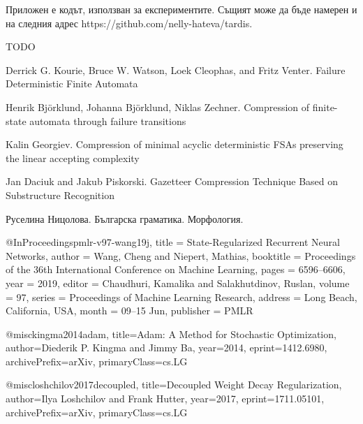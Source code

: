 \documentclass[a4paper,12pt]{article}
\begin{document}
Приложен е кодът, използван за експериментите. Същият може да бъде намерен и на следния адрес https://github.com/nelly-hateva/tardis.

TODO

\pagebreak

\begin{thebibliography}{}

\newblock Derrick G. Kourie, Bruce W. Watson, Loek Cleophas, and Fritz Venter.
\newblock Failure Deterministic Finite Automata

\newblock Henrik Björklund, Johanna Björklund, Niklas Zechner.
\newblock Compression of finite-state automata through failure transitions

\newblock Kalin Georgiev.
\newblock Compression of minimal acyclic deterministic FSAs preserving the linear accepting complexity

\newblock Jan Daciuk and Jakub Piskorski.
\newblock Gazetteer Compression Technique Based on Substructure Recognition

\newblock Руселина Ницолова.
\newblock Българска граматика. Морфология.

@InProceedings{pmlr-v97-wang19j,  
          title = 	 {State-Regularized Recurrent Neural Networks},  
          author = 	 {Wang, Cheng and Niepert, Mathias},  
          booktitle = 	 {Proceedings of the 36th International Conference on Machine Learning},  
          pages = 	 {6596--6606},  
          year = 	 {2019},  
          editor = 	 {Chaudhuri, Kamalika and Salakhutdinov, Ruslan},  
          volume = 	 {97},  
          series = 	 {Proceedings of Machine Learning Research},  
          address = 	 {Long Beach, California, USA},  
          month = 	 {09--15 Jun},  
          publisher = 	 {PMLR}  
        }

@misc{kingma2014adam,
    title={Adam: A Method for Stochastic Optimization},
    author={Diederik P. Kingma and Jimmy Ba},
    year={2014},
    eprint={1412.6980},
    archivePrefix={arXiv},
    primaryClass={cs.LG}
}

@misc{loshchilov2017decoupled,
    title={Decoupled Weight Decay Regularization},
    author={Ilya Loshchilov and Frank Hutter},
    year={2017},
    eprint={1711.05101},
    archivePrefix={arXiv},
    primaryClass={cs.LG}
}

\end{thebibliography}

\pagebreak
\end{document}
